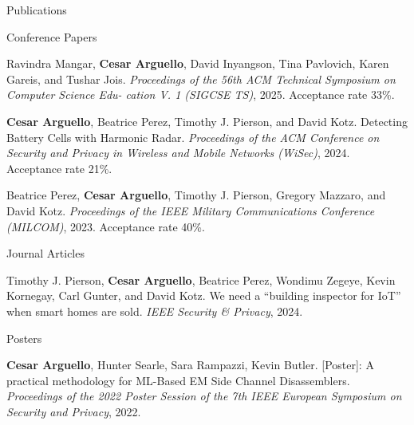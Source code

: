 \documentclass{resume} %
\begin{document}
\begin{rSection}{Publications}
  \begin{rSubsection_Conference}{Conference Papers}
    \item Ravindra Mangar, \textbf{Cesar Arguello}, David Inyangson, Tina Pavlovich, Karen Gareis, and Tushar Jois. \textit{Proceedings of the 56th ACM Technical Symposium on Computer Science Edu-
cation V. 1 (SIGCSE TS)}, 2025. Acceptance rate 33\%.
    \item \textbf{Cesar Arguello}, Beatrice Perez, Timothy J. Pierson, and David Kotz. Detecting Battery Cells with Harmonic Radar. \textit{Proceedings of the ACM Conference on Security and Privacy in Wireless and Mobile Networks (WiSec)}, 2024. Acceptance rate 21\%.
    \item Beatrice Perez, \textbf{Cesar Arguello}, Timothy J. Pierson, Gregory Mazzaro, and David Kotz. \textit{Proceedings of the IEEE Military Communications Conference (MILCOM)}, 2023. Acceptance rate 40\%. 
  \end{rSubsection_Conference}

  \begin{rSubsection_Journal}{Journal Articles}
  \item Timothy J. Pierson, \textbf{Cesar Arguello}, Beatrice Perez, Wondimu Zegeye, Kevin Kornegay, Carl Gunter, and David Kotz. We need a “building inspector for IoT” when smart homes are sold. \textit{IEEE Security \& Privacy}, 2024. 
  \end{rSubsection_Journal}

  \begin{rSubsection_Poster}{Posters}
  \item \textbf{Cesar Arguello}, Hunter Searle, Sara Rampazzi, Kevin Butler. [Poster]: A practical methodology for ML-Based EM Side Channel Disassemblers. \textit{Proceedings of the 2022 Poster Session of the 7th IEEE European Symposium on Security and Privacy}, 2022.
  \end{rSubsection_Poster}
\end{rSection}
\end{document}
